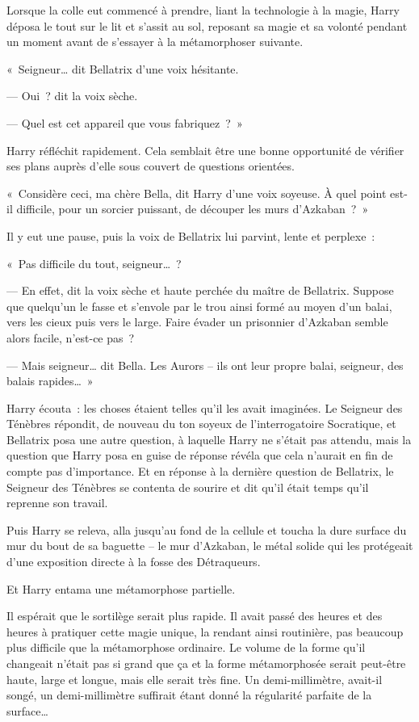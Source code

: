 Lorsque la colle eut commencé à prendre, liant la technologie à la magie, Harry déposa le tout sur le lit et s'assit au sol, reposant sa magie et sa volonté pendant un moment avant de s'essayer à la métamorphoser suivante.

«~Seigneur… dit Bellatrix d'une voix hésitante.

--- Oui~? dit la voix sèche.

--- Quel est cet appareil que vous fabriquez~?~»

Harry réfléchit rapidement.
Cela semblait être une bonne opportunité de vérifier ses plans auprès d'elle sous couvert de questions orientées.

«~Considère ceci, ma chère Bella, dit Harry d'une voix soyeuse.
À quel point est-il difficile, pour un sorcier puissant, de découper les murs d'Azkaban~?~»

Il y eut une pause, puis la voix de Bellatrix lui parvint, lente et perplexe~:

«~Pas difficile du tout, seigneur…~?

--- En effet, dit la voix sèche et haute perchée du maître de Bellatrix.
Suppose que quelqu'un le fasse et s'envole par le trou ainsi formé au moyen d'un balai, vers les cieux puis vers le large.
Faire évader un prisonnier d'Azkaban semble alors facile, n'est-ce pas~?

--- Mais seigneur… dit Bella.
Les Aurors -- ils ont leur propre balai, seigneur, des balais rapides…~»

Harry écouta~: les choses étaient telles qu'il les avait imaginées.
Le Seigneur des Ténèbres répondit, de nouveau du ton soyeux de l'interrogatoire Socratique, et Bellatrix posa une autre question, à laquelle Harry ne s'était pas attendu, mais la question que Harry posa en guise de réponse révéla que cela n'aurait en fin de compte pas d'importance.
Et en réponse à la dernière question de Bellatrix, le Seigneur des Ténèbres se contenta de sourire et dit qu'il était temps qu'il reprenne son travail.

Puis Harry se releva, alla jusqu'au fond de la cellule et toucha la dure surface du mur du bout de sa baguette -- le mur d'Azkaban, le métal solide qui les protégeait d'une exposition directe à la fosse des Détraqueurs.

Et Harry entama une métamorphose partielle.

Il espérait que le sortilège serait plus rapide.
Il avait passé des heures et des heures à pratiquer cette magie unique, la rendant ainsi routinière, pas beaucoup plus difficile que la métamorphose ordinaire.
Le volume de la forme qu'il changeait n'était pas si grand que ça et la forme métamorphosée serait peut-être haute, large et longue, mais elle serait très fine.
Un demi-millimètre, avait-il songé, un demi-millimètre suffirait étant donné la régularité parfaite de la surface…


